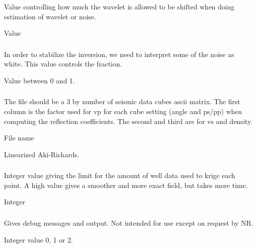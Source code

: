 \subsubsection{}
 \slist
   \item \Description Value controlling how much the wavelet is allowed to be shifted when doing estimation of wavelet or noise.
   \item \Argument Value
   \item {}
 \elist

 \subsubsection{}
 \slist
   \item \Description In order to stabilize the inversion, we need to interpret some of the noise as white. This value controls the fraction.
   \item \Argument Value between 0 and 1.
   \item {}
 \elist

\subsubsection{}
\slist
   \item \Description The file should be a 3 by  number of seismic data cubes ascii matrix. The first column is the factor used for vp for each cube setting (angle and ps/pp) when computing the reflection coefficients. The second and third are for vs and density.
   \item \Argument File name
   \item \Default Linearized Aki-Richards.
 \elist

\subsubsection{}
 \slist
   \item \Description Integer value giving the limit for the amount of well data used to krige each point. A high value gives a smoother and more exact field, but takes more time.
   \item \Argument Integer
   \item {}
 \elist

\subsubsection{}
 \slist
   \item \Description Gives debug messages and output. Not intended for use except on request by NR.
   \item \Argument Integer value 0, 1 or 2.
   \item {}
 \elist

